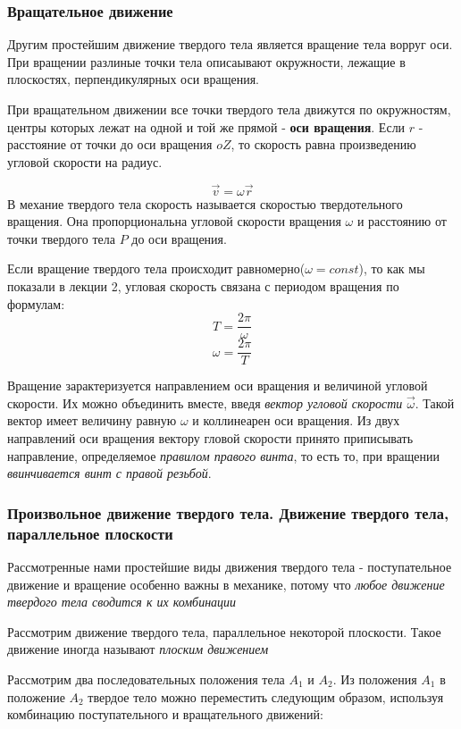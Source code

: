 \documentclass{article}
\begin{document}
\subsubsection{Вращательное движение}
Другим простейшим движение твердого тела является вращение тела ворруг оси. При вращении разлиные точки тела описаывают окружности, лежащие в плоскостях, перпендикулярных оси вращения.

При вращательном движении все точки твердого тела движутся по окружностям, центры которых лежат на одной и той же прямой - \textbf{оси вращения}. Если $r$ - расстояние от точки до оси вращения $oZ$, то скорость равна произведению угловой скорости на радиус.

$$\vec{v} = \omega \vec{r}$$
 В механие твердого тела скорость называется скоростью твердотельного вращения. Она пропорциональна угловой скорости вращения $\omega$  и расстоянию от точки твердого тела $P$ до оси вращения.

Если вращение твердого тела происходит равномерно($\omega=const$), то как мы показали в лекции 2, угловая скорость связана с периодом вращения по формулам:
$$T = \frac{2\pi}{\omega}$$
$$\omega = \frac{2\pi}{T}$$

Вращение зарактеризуется направлением оси вращения и величиной угловой скорости. Их можно объединить вместе, введя \emph{вектор угловой скорости} $\vec{\omega}$. Такой вектор имеет величину равную $\omega$ и коллинеарен оси вращения. Из двух направлений оси вращения вектору гловой скорости принято приписывать направление, определяемое \emph{правилом правого винта}, то есть то, при вращении \emph{ввинчивается винт с правой резьбой}.

\subsubsection{Произвольное движение твердого тела. Движение твердого тела, параллельное плоскости}

Рассмотренные нами простейшие виды движения твердого тела - поступательное движение и вращение особенно важны в механике, потому что \emph{любое движение твердого тела сводится к их комбинации}

Рассмотрим движение твердого тела, параллельное некоторой плоскости. Такое движение иногда называют \emph{плоским движением}

Рассмотрим два последовательных положения тела $A_1$ и $A_2$. Из положения $A_1$ в положение $A_2$ твердое тело можно переместить следующим образом, используя комбинацию поступательного и вращательного движений:
\end{document}
